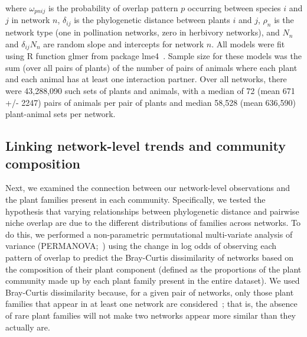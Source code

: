 \documentclass[12pt]{article}
\begin{document}
\begin{spacing}{1.5}
  \noindent where $\omega_{pnij}$ is the probability of overlap pattern $p$ occurring between
  species $i$ and $j$ in network $n$, $\delta_{ij}$ is the phylogenetic distance between 
  plants $i$ and $j$, $\rho_{n}$ is the network type (one in pollination networks,
  zero in herbivory networks), and $N_n$ and $\delta_{ij}N_{n}$ are random slope and intercepts 
  for network $n$. All models were fit using R function glmer from package lme4~\citep{lme4}.
  Sample size for these models was the sum (over all pairs of plants) of the number of pairs 
  of animals where each plant and each animal has at least one interaction partner. Over all 
  networks, there were 43,288,090 such sets of plants and animals, with a median of 72 (mean 
  671 +/- 2247) pairs of animals per pair of plants and median 58,528 (mean 636,590)
  plant-animal sets per network.



\subsection*{Linking network-level trends and community composition}

  Next, we examined the connection between our network-level observations
  and the plant families present in each community.
  Specifically, we tested the hypothesis that
  varying relationships between phylogenetic distance and
  pairwise niche overlap are due to the different distributions 
  of families across networks. To do this, we performed a non-parametric
  permutational multi-variate analysis of variance
  (PERMANOVA;~\citealp{Anderson2001}) using the change in log
  odds of observing each pattern of overlap to 
  predict the Bray-Curtis dissimilarity of networks
  based on the composition of their plant component
  (defined as the proportions of the plant community
  made up by each plant family present in the entire dataset).
  We used Bray-Curtis dissimilarity because, for a given
  pair of networks, only those plant families that appear
  in at least one network are considered~\citep{Anderson2001,Cirtwill2015}; 
  that is, the absence of rare plant families will not make 
  two networks appear more similar than they actually are. 



\end{spacing}
\end{document}
